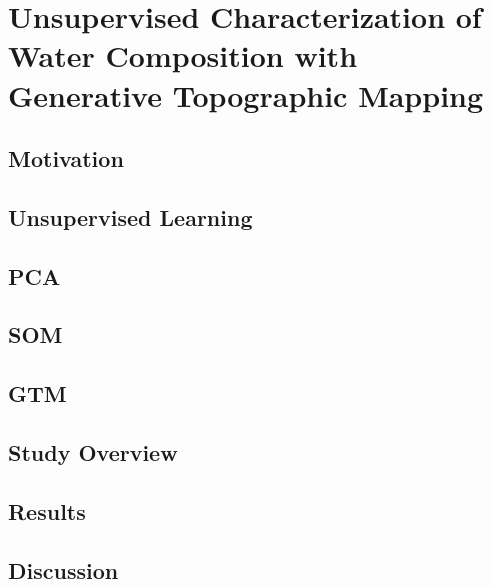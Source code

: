 \chapter{Unsupervised Characterization of Water Composition with Generative Topographic Mapping}\label{ch:robot-team-gtm}


\section{Motivation}

\section{Unsupervised Learning}

\section{PCA}

\section{SOM}

\section{GTM}

\section{Study Overview}

\section{Results}

\section{Discussion}
